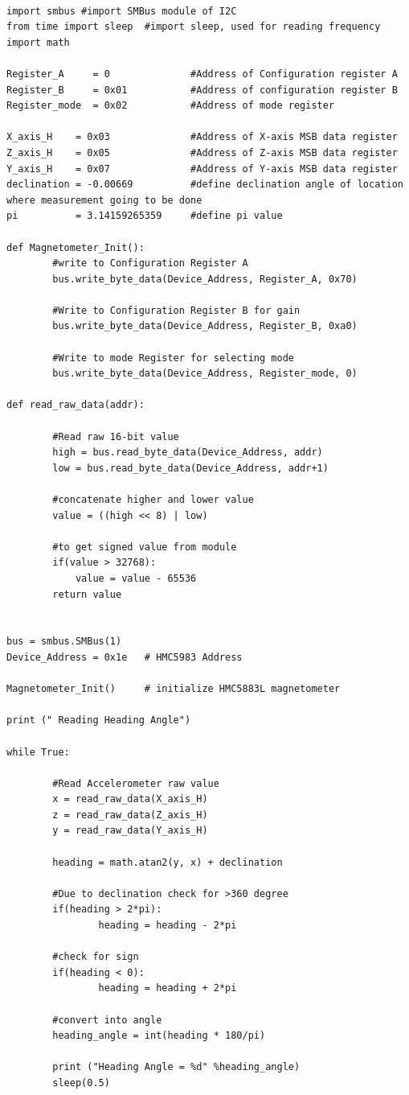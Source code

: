 \lstset{language=Python, breaklines=true, basicstyle=\footnotesize}
\begin{lstlisting}[frame=single]

import smbus #import SMBus module of I2C
from time import sleep  #import sleep, used for reading frequency
import math

Register_A     = 0              #Address of Configuration register A
Register_B     = 0x01           #Address of configuration register B
Register_mode  = 0x02           #Address of mode register

X_axis_H    = 0x03              #Address of X-axis MSB data register
Z_axis_H    = 0x05              #Address of Z-axis MSB data register
Y_axis_H    = 0x07              #Address of Y-axis MSB data register
declination = -0.00669          #define declination angle of location where measurement going to be done
pi          = 3.14159265359     #define pi value

def Magnetometer_Init():
        #write to Configuration Register A
        bus.write_byte_data(Device_Address, Register_A, 0x70)

        #Write to Configuration Register B for gain
        bus.write_byte_data(Device_Address, Register_B, 0xa0)

        #Write to mode Register for selecting mode
        bus.write_byte_data(Device_Address, Register_mode, 0)
	
def read_raw_data(addr):
    
        #Read raw 16-bit value
        high = bus.read_byte_data(Device_Address, addr)
        low = bus.read_byte_data(Device_Address, addr+1)

        #concatenate higher and lower value
        value = ((high << 8) | low)

        #to get signed value from module
        if(value > 32768):
            value = value - 65536
        return value


bus = smbus.SMBus(1) 	
Device_Address = 0x1e   # HMC5983 Address

Magnetometer_Init()     # initialize HMC5883L magnetometer 

print (" Reading Heading Angle")

while True:
   
        #Read Accelerometer raw value
        x = read_raw_data(X_axis_H)
        z = read_raw_data(Z_axis_H)
        y = read_raw_data(Y_axis_H)

        heading = math.atan2(y, x) + declination
        
        #Due to declination check for >360 degree
        if(heading > 2*pi):
                heading = heading - 2*pi

        #check for sign
        if(heading < 0):
                heading = heading + 2*pi

        #convert into angle
        heading_angle = int(heading * 180/pi)

        print ("Heading Angle = %d" %heading_angle)
        sleep(0.5)

\end{lstlisting}


